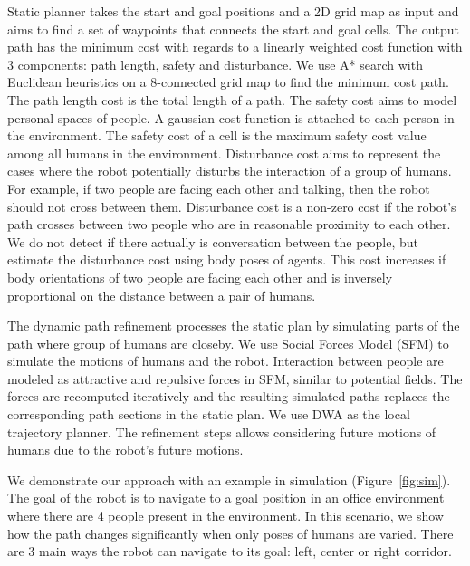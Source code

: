 \documentclass{tADR2e}
\begin{document}
Static planner takes the start and goal positions and a 2D grid map as input and aims to find a set of waypoints that connects the start and goal cells. The output path has the minimum cost with regards to a linearly weighted cost function with 3 components: path length, safety and disturbance. We use A* search with Euclidean heuristics on a 8-connected grid map to find the minimum cost path. The path length cost is the total length of a path. The safety cost aims to model personal spaces of people. A gaussian cost function is attached to each person in the environment. The safety cost of a cell is the maximum safety cost value among all humans in the environment. Disturbance cost aims to represent the cases where the robot potentially disturbs the interaction of a group of humans. For example, if two people are facing each other and talking, then the robot should not cross between them. Disturbance cost is a non-zero cost if the robot's path crosses between two people who are in reasonable proximity to each other. We do not detect if there actually is conversation between the people, but estimate the disturbance cost using body poses of agents. This cost increases if body orientations of two people are facing each other and is inversely proportional on the distance between a pair of humans. 

The dynamic path refinement processes the static plan by simulating parts of the path where group of humans are closeby. We use Social Forces Model (SFM) \cite{helbing1995social} to simulate the motions of humans and the robot. Interaction between people are modeled as attractive and repulsive forces in SFM, similar to potential fields. The forces are recomputed iteratively and the resulting simulated paths replaces the corresponding path sections in the static plan. We use DWA as the local trajectory planner. The refinement steps allows considering future motions of humans due to the robot's future motions.

We demonstrate our approach with an example in simulation (Figure~\ref{fig:sim}). The goal of the robot is to navigate to a goal position in an office environment where there are 4 people present in the environment. In this scenario, we show how the path changes significantly when only poses of humans are varied. There are 3 main ways the robot can navigate to its goal: left, center or right corridor.
\end{document}

